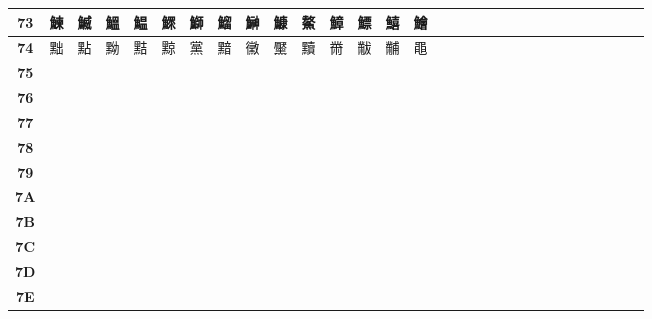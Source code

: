 \begin{table}[H]
\begin{tabular}{|Sc|Sc|Sc|Sc|Sc|Sc|Sc|Sc|Sc|Sc|Sc|Sc|Sc|Sc|Sc|}
\textbf{73} & 鰊 & 鰄 & 鰮 & 鰛 & 鰥 & 鰤 & 鰡 & 鰰 & 鱇 & 鰲 & 鱆 & 鰾 & 鱚 & 鱠 \\ \hline
\textbf{74} & 黜 & 點 & 黝 & 黠 & 黥 & 黨 & 黯 & 黴 & 黶 & 黷 & 黹 & 黻 & 黼 & 黽 \\ \hline
\textbf{75} &  &  &  &  &  &  &  &  &  &  &  &  &  &  \\ \hline
\textbf{76} &  &  &  &  &  &  &  &  &  &  &  &  &  &  \\ \hline
\textbf{77} &  &  &  &  &  &  &  &  &  &  &  &  &  &  \\ \hline
\textbf{78} &  &  &  &  &  &  &  &  &  &  &  &  &  &  \\ \hline
\textbf{79} &  &  &  &  &  &  &  &  &  &  &  &  &  &  \\ \hline
\textbf{7A} &  &  &  &  &  &  &  &  &  &  &  &  &  &  \\ \hline
\textbf{7B} &  &  &  &  &  &  &  &  &  &  &  &  &  &  \\ \hline
\textbf{7C} &  &  &  &  &  &  &  &  &  &  &  &  &  &  \\ \hline
\textbf{7D} &  &  &  &  &  &  &  &  &  &  &  &  &  &  \\ \hline
\textbf{7E} &  &  &  &  &  &  &  &  &  &  &  &  &  &  \\ \hline
\end{tabular}
\end{table}

